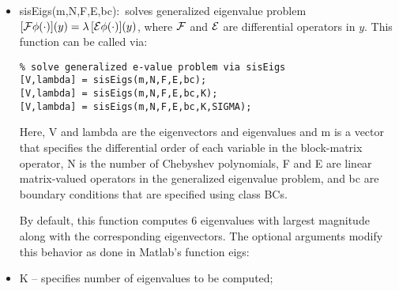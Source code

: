 \documentclass[%
secnumarabic,%
 amssymb, amsmath,%
 aps,prf,superscriptaddress,longbibliography
frontmatterverbose,
]{revtex4-2}
\begin{document}
\begin{itemize}
\begin{lstlisting}
% boundary operators
OpLeft = cell(2,1); OpLeft{1} = 2; OpLeft{2} = 3; % for 2 Dy + 3 I
OpRight = cell(2,1); OpRight{1} = 5; OpRight{2} = 6; % for 5 Dy + 6 I

% Robin BCs at y = \pm 1
bc.Operator = {OpLeft; OpRight};
bc.Points = [-1; 1];
bc.Values = [4; 7];

% Use sisSolves to solve TPBVP
% inputs to sisSolves: differential order m, N, operator, BCs, input forcing d
solution = sisSolves(m,N,A,bc,d); 
\end{lstlisting}
  
  \item {\sf sisEigs(m,N,F,E,bc):}~solves generalized eigenvalue problem $[ \mathcal{F} \phi (\cdot) ](y) = \lambda \, [ \mathcal{E} \phi (\cdot) ] (y)$, where $\mathcal{F}$ and $\mathcal{E}$ are differential operators in $y$. This function can be called via:
\begin{lstlisting}
% solve generalized e-value problem via sisEigs 
[V,lambda] = sisEigs(m,N,F,E,bc);
[V,lambda] = sisEigs(m,N,F,E,bc,K);
[V,lambda] = sisEigs(m,N,F,E,bc,K,SIGMA);
\end{lstlisting}   
Here, {\sf V} and {\sf lambda} are the eigenvectors and eigenvalues and {\sf m} is a vector that specifies the differential order of each variable in the block-matrix operator, {\sf N} is the number of Chebyshev polynomials, {\sf F} and {\sf E} are linear matrix-valued operators in the generalized eigenvalue problem, and {\sf bc} are boundary conditions that are specified using class {\sf BCs}. 
  
  By default, this function computes 6 eigenvalues with largest magnitude along with the corresponding eigenvectors. The optional arguments modify this behavior as done in Matlab's function {\sf eigs}: 
  	\bi
	\item {\sf K} -- specifies number of eigenvalues to be computed;
  

\end{itemize}
\end{document}
